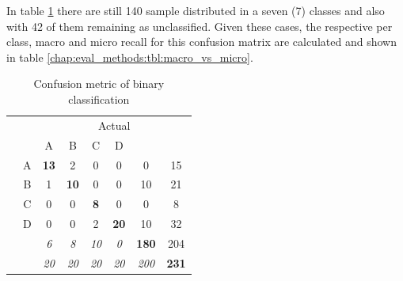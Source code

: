 In table \ref{chap:eval_methods:tbl:multi_confusion} there are still 140 sample distributed in a seven (7) classes and also with 42 of them remaining as unclassified. Given these cases, the respective per class, macro and micro recall for this confusion matrix are calculated and shown in table \ref{chap:eval_methods:tbl:macro_vs_micro}.

\begin{table}[t]
	\center
	\caption{Confusion metric of binary classification}\label{chap:eval_methods:tbl:multi_confusion}
	\begin{tabular}{c c c c c c c c}
		& & \multicolumn{6}{c}{Actual} & \\
		\cline{3-7}
		\multirow{7}{*}{\rotatebox[origin=c]{90}{Predicted}} & & \multicolumn{1}{|c}{A} & \multicolumn{1}{c}{B} & \multicolumn{1}{c}{C} & \multicolumn{1}{c}{D} & \multicolumn{1}{c|}{\emptyset} & \\
		\cline{2-7}
		& \multicolumn{1}{|c}{A} & \multicolumn{1}{|c}{\textbf{13}} & \multicolumn{1}{c}{2} & \multicolumn{1}{c}{0} & \multicolumn{1}{c}{0} & \multicolumn{1}{c|}{0} & 15 \\
		& \multicolumn{1}{|c}{B} & \multicolumn{1}{|c}{1} & \multicolumn{1}{c}{\textbf{10}} & \multicolumn{1}{c}{0} & \multicolumn{1}{c}{0} & \multicolumn{1}{c|}{10} & 21 \\
		& \multicolumn{1}{|c}{C} & \multicolumn{1}{|c}{0} & \multicolumn{1}{c}{0} & \multicolumn{1}{c}{\textbf{8}} & \multicolumn{1}{c}{0} & \multicolumn{1}{c|}{0} & 8 \\
		& \multicolumn{1}{|c}{D} & \multicolumn{1}{|c}{0} & \multicolumn{1}{c}{0} & \multicolumn{1}{c}{2} & \multicolumn{1}{c}{\textbf{20}} & \multicolumn{1}{c|}{10} & 32 \\
		& \multicolumn{1}{|c}{\emptyset} & \multicolumn{1}{|c}{\textit{6}} & \multicolumn{1}{c}{\textit{8}} & \multicolumn{1}{c}{\textit{10}} & \multicolumn{1}{c}{\textit{0}} & \multicolumn{1}{c|}{\textbf{180}} & {204} \\
		\cline{2-7}
		& & \textit{20} & \textit{20} & \textit{20} & \textit{20} & \textit{200} & \textbf{231}\\
	\end{tabular}
\end{table}


